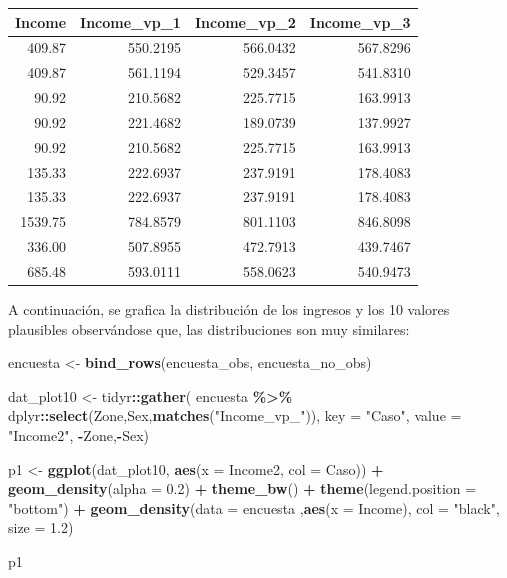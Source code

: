 \documentclass[
  12pt,
]{book}
\newenvironment{Shaded}{\begin{snugshade}}{\end{snugshade}}
\newcommand{\AttributeTok}[1]{\textcolor[rgb]{0.13,0.29,0.53}{#1}}
\newcommand{\FloatTok}[1]{\textcolor[rgb]{0.00,0.00,0.81}{#1}}
\newcommand{\FunctionTok}[1]{\textcolor[rgb]{0.13,0.29,0.53}{\textbf{#1}}}
\newcommand{\NormalTok}[1]{#1}
\newcommand{\OtherTok}[1]{\textcolor[rgb]{0.56,0.35,0.01}{#1}}
\newcommand{\SpecialCharTok}[1]{\textcolor[rgb]{0.81,0.36,0.00}{\textbf{#1}}}
\newcommand{\StringTok}[1]{\textcolor[rgb]{0.31,0.60,0.02}{#1}}
\begin{document}
\begin{tabular}{r|r|r|r}
\hline
Income & Income\_vp\_1 & Income\_vp\_2 & Income\_vp\_3\\
\hline
409.87 & 550.2195 & 566.0432 & 567.8296\\
\hline
409.87 & 561.1194 & 529.3457 & 541.8310\\
\hline
90.92 & 210.5682 & 225.7715 & 163.9913\\
\hline
90.92 & 221.4682 & 189.0739 & 137.9927\\
\hline
90.92 & 210.5682 & 225.7715 & 163.9913\\
\hline
135.33 & 222.6937 & 237.9191 & 178.4083\\
\hline
135.33 & 222.6937 & 237.9191 & 178.4083\\
\hline
1539.75 & 784.8579 & 801.1103 & 846.8098\\
\hline
336.00 & 507.8955 & 472.7913 & 439.7467\\
\hline
685.48 & 593.0111 & 558.0623 & 540.9473\\
\hline
\end{tabular}

A continuación, se grafica la distribución de los ingresos y los 10 valores plausibles observándose que, las distribuciones son muy similares:

\begin{Shaded}
\begin{Highlighting}[]
\NormalTok{encuesta }\OtherTok{\textless{}{-}} \FunctionTok{bind\_rows}\NormalTok{(encuesta\_obs, encuesta\_no\_obs)}

\NormalTok{dat\_plot10 }\OtherTok{\textless{}{-}}\NormalTok{ tidyr}\SpecialCharTok{::}\FunctionTok{gather}\NormalTok{(}
\NormalTok{  encuesta }\SpecialCharTok{\%\textgreater{}\%}\NormalTok{ dplyr}\SpecialCharTok{::}\FunctionTok{select}\NormalTok{(Zone,Sex,}\FunctionTok{matches}\NormalTok{(}\StringTok{"Income\_vp\_"}\NormalTok{)),}
  \AttributeTok{key =} \StringTok{"Caso"}\NormalTok{, }\AttributeTok{value =} \StringTok{"Income2"}\NormalTok{, }\SpecialCharTok{{-}}\NormalTok{Zone,}\SpecialCharTok{{-}}\NormalTok{Sex)}

\NormalTok{p1 }\OtherTok{\textless{}{-}} \FunctionTok{ggplot}\NormalTok{(dat\_plot10, }\FunctionTok{aes}\NormalTok{(}\AttributeTok{x =}\NormalTok{ Income2, }\AttributeTok{col =}\NormalTok{ Caso)) }\SpecialCharTok{+} 
  \FunctionTok{geom\_density}\NormalTok{(}\AttributeTok{alpha =} \FloatTok{0.2}\NormalTok{) }\SpecialCharTok{+} \FunctionTok{theme\_bw}\NormalTok{() }\SpecialCharTok{+}
   \FunctionTok{theme}\NormalTok{(}\AttributeTok{legend.position =} \StringTok{"bottom"}\NormalTok{) }\SpecialCharTok{+} \FunctionTok{geom\_density}\NormalTok{(}\AttributeTok{data =}\NormalTok{ encuesta ,}\FunctionTok{aes}\NormalTok{(}\AttributeTok{x =}\NormalTok{ Income), }\AttributeTok{col =}  \StringTok{"black"}\NormalTok{, }\AttributeTok{size =} \FloatTok{1.2}\NormalTok{) }

\NormalTok{p1}
\end{Highlighting}
\end{Shaded}
\end{document}
